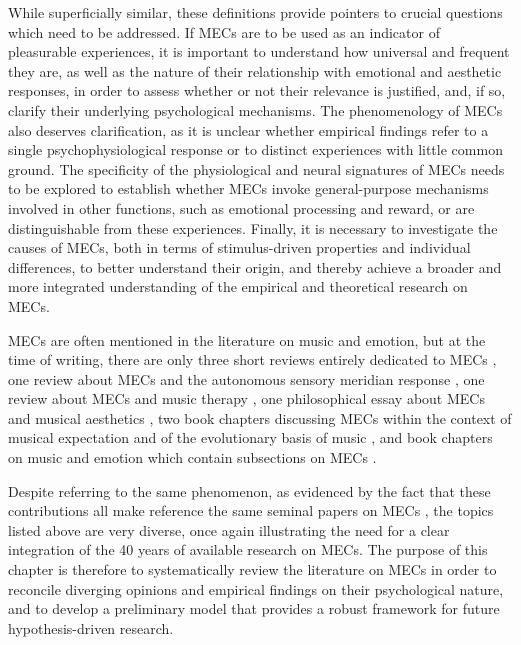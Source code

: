 While superficially similar, these definitions provide pointers to crucial questions which need to be addressed. If MECs are to be used as an indicator of pleasurable experiences, it is important to understand how universal and frequent they are, as well as the nature of their relationship with emotional and aesthetic responses, in order to assess whether or not their relevance is justified, and, if so, clarify their underlying psychological mechanisms. The phenomenology of MECs also deserves clarification, as it is unclear whether empirical findings refer to a single psychophysiological response or to distinct experiences with little common ground. The specificity of the physiological and neural signatures of MECs needs to be explored to establish whether MECs invoke general-purpose mechanisms involved in other functions, such as emotional processing and reward, or are distinguishable from these experiences. Finally, it is necessary to investigate the causes of MECs, both in terms of stimulus-driven properties and individual differences, to better understand their origin, and thereby achieve a broader and more integrated understanding of the empirical and theoretical research on MECs.

MECs are often mentioned in the literature on music and emotion, but at the time of writing, there are only three short reviews entirely dedicated to MECs \parencite{grewe2009b, harrison2014, mori2014a}, one review about MECs and the autonomous sensory meridian response \parencite{delcampo2016}, one review about MECs and music therapy \parencite{tihanyi2016}, one philosophical essay about MECs and musical aesthetics \parencite{levinson2006}, two book chapters discussing MECs within the context of musical expectation \parencite{huron2010} and of the evolutionary basis of music \parencite{altenmuller2013}, and book chapters on music and emotion which contain subsections on MECs \parencite[e.g.,][]{corrigall2013, corrigall2015, hodges2016, hunter2010, juslin2019, mcdermott2012, sachs2018, stark2018, vuust2010}.

Despite referring to the same phenomenon, as evidenced by the fact that these contributions all make reference the same seminal papers on MECs \parencite{blood2001, goldstein1980, panksepp1995, sloboda1991}, the topics listed above are very diverse, once again illustrating the need for a clear integration of the 40 years of available research on MECs. The purpose of this chapter is therefore to systematically review the literature on MECs in order to reconcile diverging opinions and empirical findings on their psychological nature, and to develop a preliminary model that provides a robust framework for future hypothesis-driven research.

